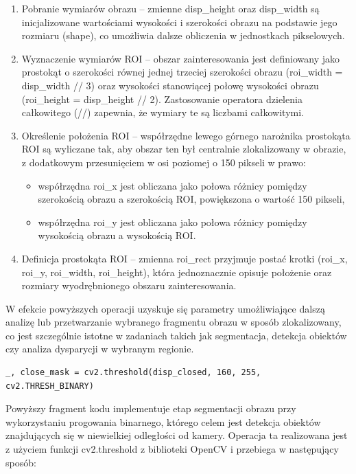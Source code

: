 \documentclass[magisterska]{pracadypl}
\begin{document}
\begin{enumerate}
  \item Pobranie wymiarów obrazu – zmienne disp\_height oraz disp\_width są inicjalizowane wartościami wysokości i szerokości obrazu na podstawie jego rozmiaru (shape), co umożliwia dalsze obliczenia w jednostkach pikselowych.
  \item Wyznaczenie wymiarów ROI – obszar zainteresowania jest definiowany jako prostokąt o szerokości równej jednej trzeciej szerokości obrazu (roi\_width = disp\_width // 3) oraz wysokości stanowiącej połowę wysokości obrazu (roi\_height = disp\_height // 2). Zastosowanie operatora dzielenia całkowitego (//) zapewnia, że wymiary te są liczbami całkowitymi.
  \item Określenie położenia ROI – współrzędne lewego górnego narożnika prostokąta ROI są wyliczane tak, aby obszar ten był centralnie zlokalizowany w obrazie, z dodatkowym przesunięciem w osi poziomej o 150 pikseli w prawo:
  \begin{itemize}
    \item współrzędna roi\_x jest obliczana jako połowa różnicy pomiędzy szerokością obrazu a szerokością ROI, powiększona o wartość 150 pikseli,
    \item współrzędna roi\_y jest obliczana jako połowa różnicy pomiędzy wysokością obrazu a wysokością ROI.
  \end{itemize}

  \item Definicja prostokąta ROI – zmienna roi\_rect przyjmuje postać krotki (roi\_x, roi\_y, roi\_width, roi\_height), która jednoznacznie opisuje położenie oraz rozmiary wyodrębnionego obszaru zainteresowania.
\end{enumerate}

W efekcie powyższych operacji uzyskuje się parametry umożliwiające dalszą analizę lub przetwarzanie wybranego fragmentu obrazu w sposób zlokalizowany, co jest szczególnie istotne w zadaniach takich jak segmentacja, detekcja obiektów czy analiza dysparycji w wybranym regionie.

\begin{lstlisting}[style=mypython]
_, close_mask = cv2.threshold(disp_closed, 160, 255, cv2.THRESH_BINARY)
\end{lstlisting}

Powyższy fragment kodu implementuje etap segmentacji obrazu przy wykorzystaniu progowania binarnego, którego celem jest detekcja obiektów znajdujących się w niewielkiej odległości od kamery. Operacja ta realizowana jest z użyciem funkcji cv2.threshold z biblioteki OpenCV i przebiega w następujący sposób:
\end{document}
